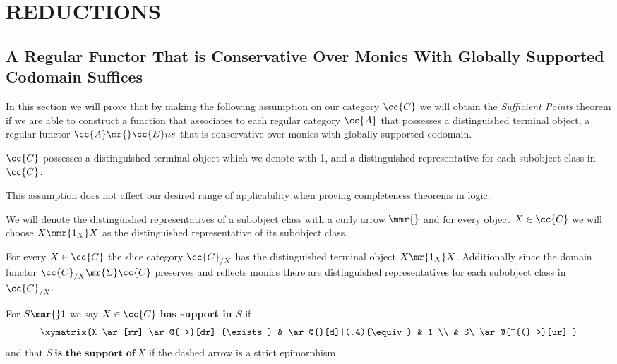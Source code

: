 
\section{REDUCTIONS}\label{reduction}


\subsection{A Regular Functor That is Conservative Over Monics With Globally Supported Codomain Suffices} \label{gamma sub S}

In this section we will prove that by making the following assumption on our category $\cc{C}$ we will obtain  the \textit{Sufficient Points} theorem if we are able to construct a function that associates to each regular category $\cc{A}$ that possesses a distinguished terminal object, a regular functor $\cc{A} \mr{} \cc{E}ns$ that is conservative over monics with globally supported codomain.

\begin{assumption}\label{rep asumption}
$\cc{C}$ possesses a distinguished terminal object which we denote with 1, and a distinguished representative for each subobject class in $\cc{C}$. 
\end{assumption}


\begin{remark}
 This assumption does not affect our desired range of applicability when proving completeness theorems in logic. 
\end{remark} 
 
 We will denote the distinguished representatives of a subobject class with a curly arrow $\mmr{}$ and for every object $X \in  \cc{C}$ we will choose $X \mmr{1_X} X$ as the distinguished representative of its subobject class. 

\begin{observation}
For every $X \in \cc{C}$ the slice category $\cc{C}_{/X}$ has the distinguished terminal object ${X \mr{1_X} X}$. Additionally since the domain functor $\cc{C}_{/X} \mr{\Sigma} \cc{C}$ preserves and reflects monics there are distinguished representatives for each subobject class in $\cc{C}_{/X}$. 
\end{observation}

\begin{definition}
For  $S \mmr{} 1$ we say  $X \in  \cc{C}$ \textbf{ has support in $S$} if
\[
\xymatrix{X \ar[rr] \ar@{-->}[dr]_{\exists} & \ar@{}[d]|(.4){\equiv} & 1 \\ 
                  & S\ \ar@{^{(}->}[ur] }
\]
and that $S\ \textbf{is the support of}\ X$ if the dashed arrow is a strict epimorphism.
\end{definition}

